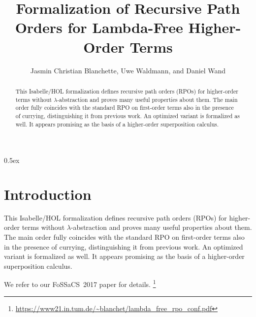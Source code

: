 \documentclass[10pt,a4paper]{article}
\begin{document}
\title{Formalization of Recursive Path Orders for Lambda-Free Higher-Order Terms}
\author{Jasmin Christian Blanchette, Uwe Waldmann, and Daniel Wand}

\maketitle

\begin{abstract}
\noindent
This Isabelle/HOL formalization defines recursive path orders (RPOs) for
higher-order terms without $\lambda$-abstraction and proves many useful
properties about them. The main order fully coincides with the standard RPO on
first-order terms also in the presence of currying, distinguishing it from
previous work. An optimized variant is formalized as well. It appears
promising as the basis of a higher-order superposition calculus.
\end{abstract}

\tableofcontents

\parindent 0pt
\parskip 0.5ex

\section{Introduction}

This Isabelle/HOL formalization defines recursive path orders (RPOs) for
higher-order terms without $\lambda$-abstraction and proves many useful
properties about them. The main order fully coincides with the standard RPO on
first-order terms also in the presence of currying, distinguishing it from
previous work. An optimized variant is formalized as well. It appears
promising as the basis of a higher-order superposition calculus.

We refer to our FoSSaCS~2017 paper for details.%
\footnote{\url{https://www21.in.tum.de/~blanchet/lambda_free_rpo_conf.pdf}}



%
%

%
%
\end{document}
